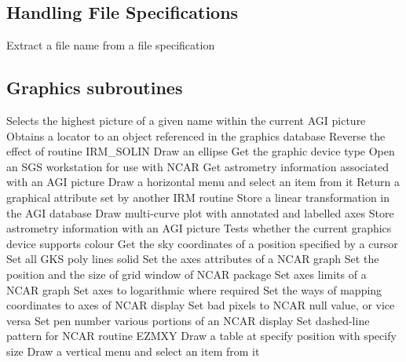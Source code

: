 \subsection {Handling File Specifications}
  {Extract a file name from a file specification}

\subsection {Graphics subroutines}
  {Selects the highest picture of a given name within the current AGI picture}
  {Obtains a locator to an object referenced in the graphics database}
  {Reverse the effect of routine IRM\_SOLIN}
  {Draw an ellipse}
  {Get the graphic device type}
  {Open an SGS workstation for use with NCAR}
  {Get astrometry information associated with an AGI picture}
  {Draw a horizontal menu and select an item from it}
  {Return a graphical attribute set by another IRM routine}
  {Store a linear transformation in the AGI database}
  {Draw multi-curve plot with annotated and labelled axes}
  {Store astrometry information with an AGI picture}
  {Tests whether the current graphics device supports colour}
  {Get the sky coordinates of a position specified by a cursor}
  {Set all GKS poly lines solid}
  {Set the axes attributes of a NCAR graph}
  {Set the position and the size of grid window of NCAR package}
  {Set axes limits of a NCAR graph}
  {Set axes to logarithmic where required}
  {Set the ways of mapping coordinates to axes of NCAR display}
  {Set bad pixels to NCAR null value, or vice versa}
  {Set pen number various portions of an NCAR display}
  {Set dashed-line pattern for NCAR routine EZMXY}
  {Draw a table at specify position with specify size}
  {Draw a vertical menu and select an item from it}

